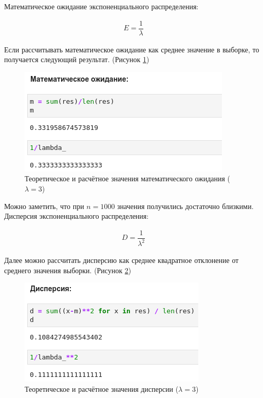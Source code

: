 \documentclass[14pt,fleqn]{extarticle}
\begin{document}
	Математическое ожидание экспоненциального распределения:
	\begin{ceqn}
		\begin{align*}
			E = \dfrac{1}{\lambda}
		\end{align*}
	\end{ceqn}
	\newpage
	Если рассчитывать математическое ожидание как среднее значение в выборке, то получается следующий результат. (Рисунок \ref{fig:exp_inverse_function_method_math})
	\begin{figure}[h]
		\centering \includegraphics[scale=0.7]{result31}
		\caption{Теоретическое и расчётное значения математического ожидания ($\lambda = 3$)}
		\label{fig:exp_inverse_function_method_math}
	\end{figure}

	Можно заметить, что при $n = 1000$ значения получились достаточно близкими.\\
	Дисперсия экспоненциального распределения:
	\begin{ceqn}
		\begin{align*}
			D = \dfrac{1}{\lambda^2}
		\end{align*}
	\end{ceqn}
	Далее можно рассчитать дисперсию как среднее квадратное отклонение от среднего значения выборки. (Рисунок \ref{fig:exp_inverse_function_method_var})
	\begin{figure}[h]
		\centering \includegraphics[scale=0.7]{result32}
		\caption{Теоретическое и расчётное значения дисперсии ($\lambda = 3$)}
		\label{fig:exp_inverse_function_method_var}
	\end{figure}
\end{document}
